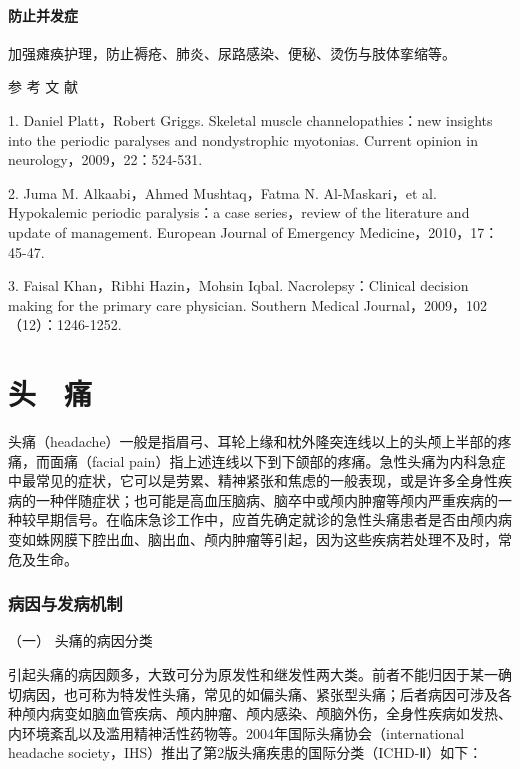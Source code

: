\subsubsection{防止并发症}

加强瘫痪护理，防止褥疮、肺炎、尿路感染、便秘、烫伤与肢体挛缩等。


\hypertarget{text00019.htmlux5cux23CHP1-6-4}{}
参 考 文 献

1. Daniel Platt，Robert Griggs. Skeletal muscle channelopathies：new
insights into the periodic paralyses and nondystrophic myotonias.
Current opinion in neurology，2009，22：524-531.

2. Juma M. Alkaabi，Ahmed Mushtaq，Fatma N. Al-Maskari，et al.
Hypokalemic periodic paralysis：a case series，review of the literature
and update of management. European Journal of Emergency
Medicine，2010，17：45-47.

3. Faisal Khan，Ribhi Hazin，Mohsin Iqbal. Nacrolepsy：Clinical decision
making for the primary care physician. Southern Medical
Journal，2009，102（12）：1246-1252.

\protect\hypertarget{text00020.html}{}{}

\chapter{头　痛}

头痛（headache）一般是指眉弓、耳轮上缘和枕外隆突连线以上的头颅上半部的疼痛，而面痛（facial
pain）指上述连线以下到下颌部的疼痛。急性头痛为内科急症中最常见的症状，它可以是劳累、精神紧张和焦虑的一般表现，或是许多全身性疾病的一种伴随症状；也可能是高血压脑病、脑卒中或颅内肿瘤等颅内严重疾病的一种较早期信号。在临床急诊工作中，应首先确定就诊的急性头痛患者是否由颅内病变如蛛网膜下腔出血、脑出血、颅内肿瘤等引起，因为这些疾病若处理不及时，常危及生命。

\subsection{病因与发病机制}

\hypertarget{text00020.htmlux5cux23CHP1-7-1-1}{}
（一） 头痛的病因分类

引起头痛的病因颇多，大致可分为原发性和继发性两大类。前者不能归因于某一确切病因，也可称为特发性头痛，常见的如偏头痛、紧张型头痛；后者病因可涉及各种颅内病变如脑血管疾病、颅内肿瘤、颅内感染、颅脑外伤，全身性疾病如发热、内环境紊乱以及滥用精神活性药物等。2004年国际头痛协会（international
headache society，IHS）推出了第2版头痛疾患的国际分类（ICHD-Ⅱ）如下：


